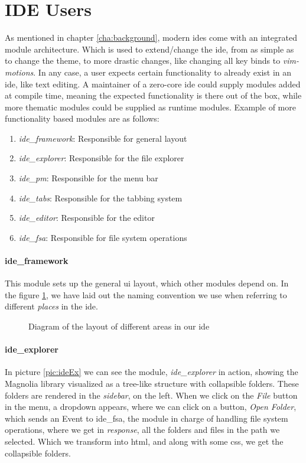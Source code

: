 \section{IDE Users}

As mentioned in chapter \ref{cha:background}, modern \gls*{ide}s come with an
integrated module architecture. Which is used to extend/change the \gls*{ide},
from as simple as to change the theme, to more drastic changes, like changing
all key binds to \textit{vim-motions}. In any case, a user expects certain
functionality to already exist in an \gls*{ide}, like text editing. A maintainer
of a zero-core \gls*{ide} could supply modules added at compile time, meaning the
expected functionality is there out of the box, while more thematic modules
could be supplied as runtime modules. Example of more functionality based
modules are as follows:

\begin{enumerate}
  \item \textit{ide\_framework}: Responsible for general layout
  \item \textit{ide\_explorer}: Responsible for the file explorer
  \item \textit{ide\_pm}: Responsible for the menu bar
  \item \textit{ide\_tabs}: Responsible for the tabbing system
  \item \textit{ide\_editor}: Responsible for the editor
  \item \textit{ide\_fsa}: Responsible for file system operations
\end{enumerate}

\paragraph{ide\_framework} This module sets up the general \gls*{ui} layout,
which other modules depend on. In the figure \ref{fig:ideLayout}, we have laid
out the naming convention we use when referring to different \textit{places} in
the \gls*{ide}.

\begin{figure}[H]
  \centering
  
  \caption{
    Diagram of the layout of different areas in our \gls*{ide}
  }
  \label{fig:ideLayout}
\end{figure}

\paragraph{ide\_explorer} In picture \ref{pic:ideEx} we can see the
module, \textit{ide\_explorer} in action, showing the Magnolia library
visualized as a tree-like structure with collapsible folders. These folders are
rendered in the \textit{sidebar}, on the left. When we click on the
\textit{File} button in the menu, a dropdown appears, where we can click on a
button, \textit{Open Folder}, which sends an Event to ide\_fsa, the module in
charge of handling file system operations, where we get in \textit{response},
all the folders and files in the path we selected. Which we transform into
\gls*{html}, and along with some \gls*{css}, we get the collapsible folders.

